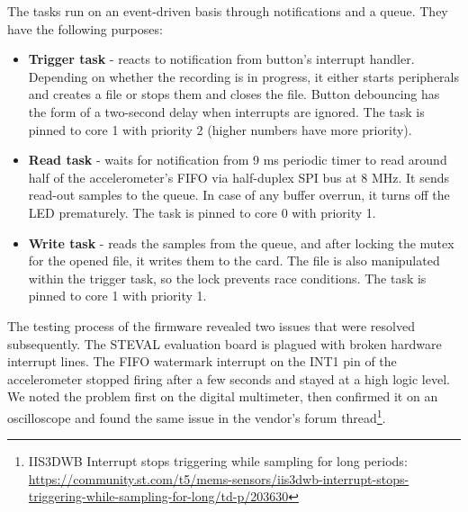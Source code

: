 The tasks run on an event-driven basis through notifications and a queue. They have the following purposes:
\begin{itemize}
\itemsep0pt
\item \textbf{Trigger task} - reacts to notification from button's interrupt handler. Depending on whether the recording is in progress, it either starts peripherals and creates a file or stops them and closes the file. Button debouncing has the form of a two-second delay when interrupts are ignored. The task is pinned to core 1 with priority 2 (higher numbers have more priority).
\item \textbf{Read task} - waits for notification from 9 ms periodic timer to read around half of the accelerometer's FIFO via half-duplex SPI bus at 8 MHz. It sends read-out samples to the queue. In case of any buffer overrun, it turns off the LED prematurely. The task is pinned to core 0 with priority 1.
\item \textbf{Write task} - reads the samples from the queue, and after locking the mutex for the opened file, it writes them to the card. The file is also manipulated within the trigger task, so the lock prevents race conditions. The task is pinned to core 1 with priority 1.
\end{itemize}

The testing process of the firmware revealed two issues that were resolved subsequently. The STEVAL evaluation board is plagued with broken hardware interrupt lines. The FIFO watermark interrupt on the INT1 pin of the accelerometer stopped firing after a few seconds and stayed at a high logic level. We noted the problem first on the digital multimeter, then confirmed it on an oscilloscope and found the same issue in the vendor's forum thread\footnote{IIS3DWB Interrupt stops triggering while sampling for long periods: \url{https://community.st.com/t5/mems-sensors/iis3dwb-interrupt-stops-triggering-while-sampling-for-long/td-p/203630}}.


